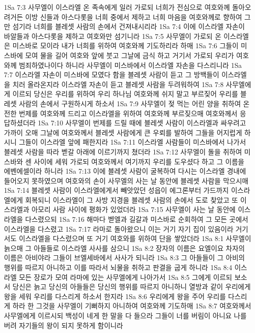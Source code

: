 1Sa 7:3  사무엘이 이스라엘 온 족속에게 일러 가로되 너희가 전심으로 여호와께 돌아오려거든 이방 신들과 아스다롯을 너희 중에서 제하고 너희 마음을 여호와께로 향하여 그만 섬기라 너희를 블레셋 사람의 손에서 건져내시리라
1Sa 7:4  이에 이스라엘 자손이 바알들과 아스다롯을 제하고 여호와만 섬기니라
1Sa 7:5  사무엘이 가로되 온 이스라엘은 미스바로 모이라 내가 너희를 위하여 여호와께 기도하리라 하매
1Sa 7:6  그들이 미스바에 모여 물을 길어 여호와 앞에 붓고 그날에 금식 하고 거기서 가로되 우리가 여호와께 범죄하였나이다 하니라 사무엘이 미스바에서 이스라엘 자손을 다스리니라
1Sa 7:7  이스라엘 자손이 미스바에 모였다 함을 블레셋 사람이 듣고 그 방백들이 이스라엘을 치러 올라온지라 이스라엘 자손이 듣고 블레셋 사람을 두려워하여
1Sa 7:8  사무엘에게 이르되 당신은 우리를 위하여 우리 하나님 여호와께 쉬지 말고 부르짖어 우리를 블레셋 사람의 손에서 구원하시게 하소서
1Sa 7:9  사무엘이 젖 먹는 어린 양을 취하여 온전한 번제를 여호와께 드리고 이스라엘을 위하여 여호와께 부르짖으매 여호와께서 응답하셨더라
1Sa 7:10  사무엘이 번제를 드릴 때에 블레셋 사람이 이스라엘과 싸우려고 가까이 오매 그날에 여호와께서 블레셋 사람에게 큰 우뢰를 발하여 그들을 어지럽게 하시니 그들이 이스라엘 앞에 패한지라
1Sa 7:11  이스라엘 사람들이 미스바에서 나가서 블레셋 사람을 따라 벧갈 아래에 이르기까지 쳤더라
1Sa 7:12  사무엘이 돌을 취하여 미스바와 센 사이에 세워 가로되 여호와께서 여기까지 우리를 도우셨다 하고 그 이름을 에벤에셀이라 하니라
1Sa 7:13  이에 블레셋 사람이 굴복하여 다시는 이스라엘 경내에 들어오지 못하였으며 여호와의 손이 사무엘의 사는 날 동안에 블레셋 사람을 막으시매
1Sa 7:14  블레셋 사람이 이스라엘에게서 빼앗았던 성읍이 에그론부터 가드까지 이스라엘에게 회복되니 이스라엘이 그 사방 지경을 블레셋 사람의 손에서 도로 찾았고 또 이스라엘과 아모리 사람 사이에 평화가 있었더라
1Sa 7:15  사무엘이 사는 날 동안에 이스라엘을 다스렸으되
1Sa 7:16  해마다 벧엘과 길갈과 미스바로 순회하여 그 모든 곳에서 이스라엘을 다스렸고
1Sa 7:17  라마로 돌아왔으니 이는 거기 자기 집이 있음이라 거기서도 이스라엘을 다스렸으며 또 거기 여호와를 위하여 단을 쌓았더라
1Sa 8:1  사무엘이 늙으매 그 아들들로 이스라엘 사사를 삼으니
1Sa 8:2  장자의 이름은 요엘이요 차자의 이름은 아비야라 그들이 브엘세바에서 사사가 되니라
1Sa 8:3  그 아들들이 그 아비의 행위를 따르지 아니하고 이를 따라서 뇌물을 취하고 판결을 굽게 하니라
1Sa 8:4  이스라엘 모든 장로가 모여 라마에 있는 사무엘에게 나아가서
1Sa 8:5  그에게 이르되 보소서 당신은 늙고 당신의 아들들은 당신의 행위를 따르지 아니하니 열방과 같이 우리에게 왕을 세워 우리를 다스리게 하소서 한지라
1Sa 8:6  우리에게 왕을 주어 우리를 다스리게 하라 한 그것을 사무엘이 기뻐하지 아니하여 여호와께 기도하매
1Sa 8:7  여호와께서 사무엘에게 이르시되 백성이 네게 한 말을 다 들으라 그들이 너를 버림이 아니요 나를 버려 자기들의 왕이 되지 못하게 함이니라
